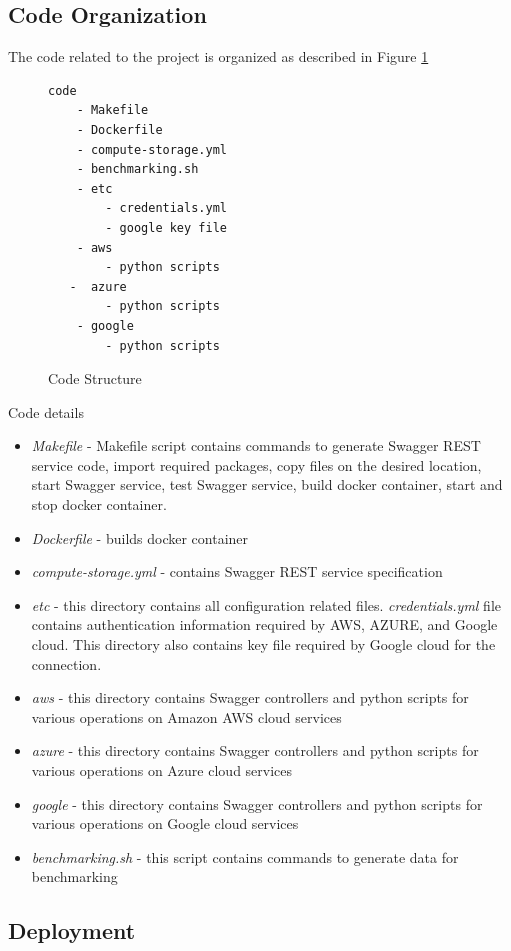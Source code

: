 \subsection{Code Organization}


The code related to the project is organized as described in Figure \ref{c:code-structure}
\begin{figure}[htb]
\begin{verbatim}
code
    - Makefile
    - Dockerfile
    - compute-storage.yml
    - benchmarking.sh
    - etc
        - credentials.yml
        - google key file
    - aws
        - python scripts
   -  azure
        - python scripts
    - google
        - python scripts
\end{verbatim}
\caption{Code Structure}\label{c:code-structure}
\end{figure}

Code details
\begin{itemize}
\item \emph{Makefile} - Makefile script contains commands to
generate Swagger REST service code, import required packages,
copy files on the desired location, start Swagger service, test
Swagger service, build docker container, start and stop docker
container.
\item \emph{Dockerfile} - builds docker container
\item \emph{compute-storage.yml} - contains Swagger REST service
specification
\item \emph{etc} - this directory contains all configuration related files. \emph{credentials.yml} file contains
authentication information required by AWS, AZURE, and Google
cloud. This directory also contains key file required by Google cloud for the connection.
\item \emph{aws} - this directory contains Swagger controllers 
and python scripts for various operations on Amazon AWS cloud services
\item \emph{azure} - this directory contains Swagger controllers
and python scripts for various operations on Azure cloud services
\item \emph{google} - this directory contains Swagger controllers
and python scripts for various operations on Google cloud services
\item \emph{benchmarking.sh} - this script contains commands to generate data for benchmarking
\end{itemize}

\subsection{Deployment}

